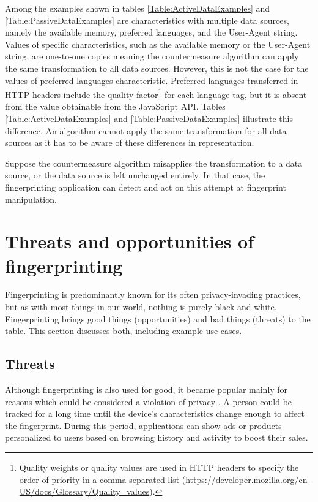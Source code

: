 Among the examples shown in tables \ref{Table:ActiveDataExamples} and \ref{Table:PassiveDataExamples} are characteristics with multiple data sources, namely the available memory, preferred languages, and the User-Agent string. Values of specific characteristics, such as the available memory or the User-Agent string, are one-to-one copies meaning the countermeasure algorithm can apply the same transformation to all data sources. However, this is not the case for the values of preferred languages characteristic. Preferred languages transferred in HTTP headers include the quality factor\footnote{Quality weights or quality values are used in HTTP headers to specify the order of priority in a comma-separated list (\url{https://developer.mozilla.org/en-US/docs/Glossary/Quality_values}).} for each language tag, but it is absent from the value obtainable from the JavaScript API. Tables \ref{Table:ActiveDataExamples} and \ref{Table:PassiveDataExamples} illustrate this difference. An algorithm cannot apply the same transformation for all data sources as it has to be aware of these differences in representation.

Suppose the countermeasure algorithm misapplies the transformation to a data source, or the data source is left unchanged entirely. In that case, the fingerprinting application can detect and act on this attempt at fingerprint manipulation.

\section{Threats and opportunities of fingerprinting}
\label{FingerprintingThreatsOpportunities}

Fingerprinting is predominantly known for its often privacy-invading practices, but as with most things in our world, nothing is purely black and white. Fingerprinting brings good things (opportunities) and bad things (threats) to the table. This section discusses both, including example use cases.

\subsection{Threats}

Although fingerprinting is also used for good, it became popular mainly for reasons which could be considered a violation of privacy \cite{WP224Fingerprinting}. A person could be tracked for a long time until the device's characteristics change enough to affect the fingerprint. During this period, applications can show ads or products personalized to users based on browsing history and activity to boost their sales.

